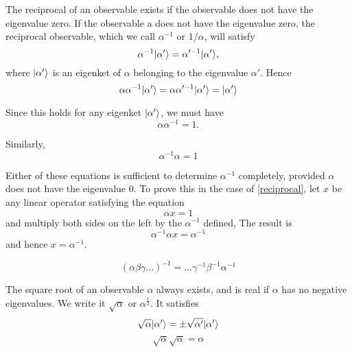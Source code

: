The reciprocal of an observable exists if the observable does not have the eigenvalue zero. If the observable a does not have the eigenvalue zero, the reciprocal observable, which we call $\alpha ^{-1}$ or $1/\alpha$, will satisfy
\begin{equation}
\alpha ^{-1} | \alpha' \rangle = \alpha'^{-1}| \alpha' \rangle,
\end{equation}
where $| \alpha' \rangle$ is an eigenket of $\alpha$ belonging to the eigenvalue $\alpha'$. Hence
\begin{equation}
\alpha \alpha^{-1} | \alpha' \rangle = \alpha \alpha'^{-1}| \alpha' \rangle=| \alpha' \rangle
\end{equation}

Since this holds for any eigenket $| \alpha' \rangle$, we must have
\begin{equation}
\alpha \alpha^{-1} =1.
\label{reciprocal}
\end{equation}

Similarly,
\begin{equation}
\alpha^{-1}\alpha=1
\end{equation}

Either of these equations is sufficient to determine $\alpha^{-1}$ completely, provided $\alpha$ does not have the eigenvalue $0$. To prove this in the case of 
\ref{reciprocal}, let $x$ be any linear operator satisfying the equation
\begin{equation}
\alpha x = 1
\end{equation}
and multiply both sides on the left by the $\alpha^{-1}$ defined, The result is
\begin{equation}
\alpha ^{-1} \alpha x = \alpha ^{-1}
\end{equation}
and hence $x=\alpha ^{-1}$.

\begin{equation}
(\alpha\beta\gamma...)^{-1}=...\gamma^{-1}\beta^{-1}\alpha^{-1}
\end{equation}

The square root of an observable $\alpha$ always exists, and is real if $\alpha$ has no negative eigenvalues. We write it $\sqrt{\alpha}$ or $\alpha ^{\frac{1}{2}}$. It satisfies
\begin{equation}
\sqrt{\alpha} | \alpha' \rangle = \pm \sqrt{\alpha'} | \alpha' \rangle
\end{equation}
\begin{equation}
\sqrt{\alpha}\sqrt{\alpha}=\alpha
\end{equation}

